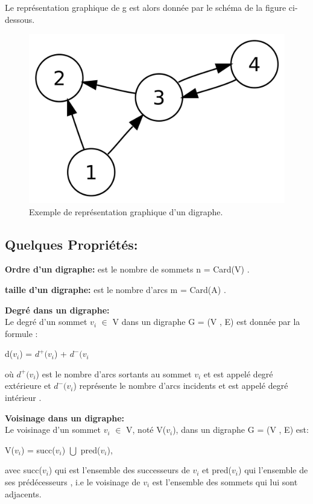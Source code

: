 		
		Le représentation graphique de g est alors donnée par le schéma de la figure ci-dessous.
		
		
			\begin{figure}[h]
			\includegraphics[scale=0.15,center]{./ressources/image/RepDiGraphe.png}
			\caption[Exemple de représentation graphique d'un digraphe.]{Exemple de représentation graphique d'un digraphe.}
			\end{figure}
			
		
		\subsection{Quelques Propriétés:} %
		
			\textbf{Ordre d'un digraphe:}
			est le nombre de sommets n = Card(V) \citep{DUT}.
			
			\textbf{taille d'un digraphe:} est le nombre d’arcs m = Card(A) \citep{DUT}.
			
			\textbf{Degré dans un digraphe:}\\
			Le degré d'un sommet $v_{i}$ $\in$ V dans un digraphe G = (V , E) est donnée par la formule :\\
			\begin{center}
				d($v_{i}$) = $d^+(v_{i}$) + $d^-(v_{i}$\\
			\end{center}			 
			 où $d^+(v_{i}$) est le nombre d'arcs sortants au sommet $v_{i}$ et est appelé degré extérieure et $d^-(v_{i}$) représente le nombre d'arcs incidents et est appelé degré intérieur \citep{muller}.
			 
			 \textbf{Voisinage dans un digraphe:}\\
			 Le voisinage d'un sommet $v_{i}$ $\in$ V, noté V($v_{i}$), dans un digraphe G = (V , E) est:
			 	\begin{center}
				V($v_{i}$) = succ($v_{i}$) $\bigcup$ pred($v_{i}$),
				\end{center}
				
				 avec succ($v_{i}$) qui est l'ensemble des successeurs de $v_{i}$ et pred($v_{i}$) qui l'ensemble de ses prédécesseurs \citep{bac}, i.e le voisinage de $v_{i}$ est l'ensemble des sommets qui lui sont adjacents.